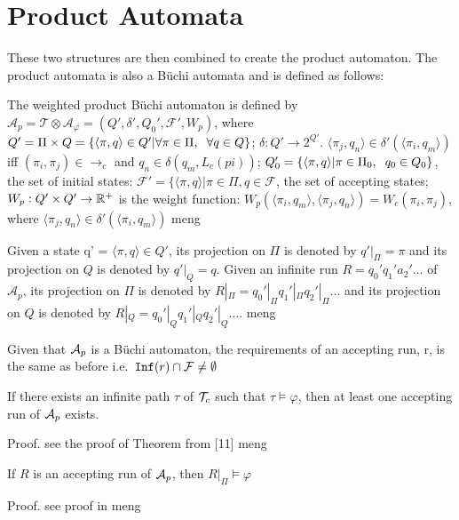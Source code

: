 \section{Product Automata}
These two structures are then combined to create the product automaton. The product automata is also a B\"{u}chi automata and is defined as follows:
\begin{definition}
The weighted product B\"{u}chi automaton is defined by $\mathcal{A}_p = \mathcal{T} \otimes \mathcal{A}_\varphi = (Q', \delta', Q_0', \mathcal{F}', W_p)$, where $Q' = \Pi \times Q = \{ \langle \pi, q \rangle \in Q' | \forall \pi \in \Pi, \hspace{0.2cm} \forall q \in Q \}$; $\delta: Q' \rightarrow 2^{Q'}$. $\langle \pi_j, q_n \rangle \in \delta' (\langle \pi_i, q_m \rangle )$ iff $(\pi_i , \pi_j ) \in \rightarrow_c$ and $q_n \in \delta (q_m, L_c(pi))$; $Q_0' = \{ \langle \pi , q \rangle | \pi \in \Pi_0, \hspace{0.2cm} q_0 \in Q_0\}$, the set of initial states: $\mathcal{F}' = \{ \langle \pi, q \rangle | \pi \in \Pi, q \in \mathcal{F}$, the set of accepting states; $W_p: Q' \times Q' \rightarrow \mathbb{R}^+$ is the weight function: $W_p(\langle \pi_i, q_m \rangle , \langle \pi_j, q_n \rangle ) = W_c (\pi_i, \pi_j)$, where $\langle \pi_j, q_n \rangle \in \delta' ( \langle \pi_i, q_m \rangle )$ meng
\end{definition} 

Given a state q' = $\langle \pi, q \rangle \in Q'$, its projection on $\Pi$ is denoted by $q'|_\Pi = \pi$ and its projection on $Q$ is denoted by $q'|_Q = q$. Given an infinite run $R = q_0' q_1' a_2' \dots$ of $\mathcal{A}_p$, its projection on $\Pi$ is denoted by $R|_\Pi = q_0'|_\Pi q_1'|_\Pi q_2'|_\Pi \dots$ and its projection on $Q$ is denoted by $R|_Q  = q_0'|_Q q_1'|_Q q_2'|_Q \dots$. meng

Given that $\mathcal{A}_p$ is a B\"{u}chi automaton, the requirements of an accepting run, r, is the same as before i.e.\ $\texttt{Inf}(r) \cap \mathcal{F} \neq \emptyset$

\begin{lemma}
If there exists an infinite path $\tau$ of $\mathcal{T}_c$ such that $\tau \models \varphi$, then at least one accepting run of $\mathcal{A}_p$ exists.
\end{lemma}
Proof. see the proof of Theorem from [11] meng

\begin{lemma}
\label{lemma1}
If $R$ is an accepting run of $\mathcal{A}_p$, then $R|_\Pi \models \varphi$ 
\end{lemma}
Proof. see proof in meng

